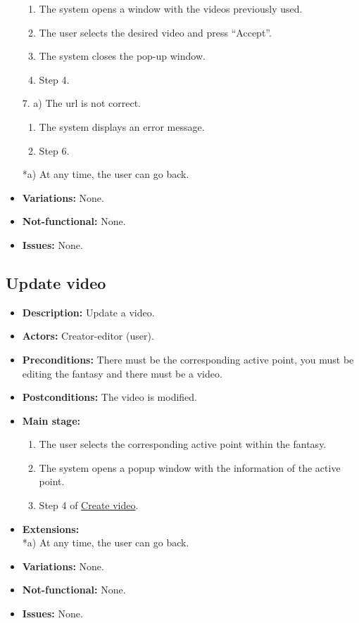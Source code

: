 \begin{itemize}
\begin{enumerate}
		\item The system opens a window with the videos previously used.
		\item The user selects the desired video and press ``Accept''.
		\item The system closes the pop-up window.
		\item Step 4.
	\end{enumerate}
	7. a) The url is not correct.
	\begin{enumerate}
		\item The system displays an error message.
		\item Step 6.
	\end{enumerate}
	*a) At any time, the user can go back.
	\item \textbf{Variations:} None.
	\item \textbf{Not-functional:} None.
	\item \textbf{Issues:} None.
\end{itemize}

\subsection{Update video}
\begin{itemize}
	\item \textbf{Description:} Update a video.
	\item \textbf{Actors:} Creator-editor (user).
	\item \textbf{Preconditions:} There must be the corresponding active point, you must be editing the fantasy and there must be a video.
	\item \textbf{Postconditions:} The video is modified.
	\item \textbf{Main stage:}
	\begin{enumerate}
		\item The user selects the corresponding active point within the fantasy.
		\item The system opens a popup window with the information of the active point.
		\item Step 4 of \hyperlink{crearvideo}{Create video}.
	\end{enumerate}
	\item \textbf{Extensions:} \\ *a) At any time, the user can go back.
	\item \textbf{Variations:} None.
	\item \textbf{Not-functional:} None.
	\item \textbf{Issues:} None.
\end{itemize}

